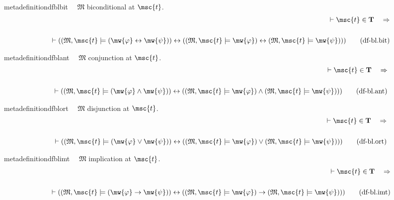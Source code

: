 \begin{restatable}{metadefinition}{dfblbit}~~ $\mathfrak{M}$ biconditional at
$\msc{t}$.
\begin{align}
\vdash \msc{t} \in \mathbf{T}\quad\Rightarrow \notag \\ 
	 \notag \\ 
	\quad \vdash ( ( \mathfrak{M} ,
    \msc{t} \models ( \mw{\varphi} \leftrightarrow \mw{\psi} ) )
    \leftrightarrow ( ( \mathfrak{M} , \msc{t} \models \mw{\varphi} )
    \leftrightarrow ( \mathfrak{M} , \msc{t} \models \mw{\psi} ) )
    )\label{eq:df-bl.bit}\tag{df-bl.bit}
\end{align}
\end{restatable}

\begin{restatable}{metadefinition}{dfblant}~~ $\mathfrak{M}$ conjunction at
$\msc{t}$.
\begin{align}
\vdash \msc{t} \in \mathbf{T}\quad\Rightarrow \notag \\ 
	 \notag \\ 
	\quad \vdash ( ( \mathfrak{M} ,
    \msc{t} \models ( \mw{\varphi} \wedge \mw{\psi} ) ) \leftrightarrow ( (
    \mathfrak{M} , \msc{t} \models \mw{\varphi} ) \wedge ( \mathfrak{M} ,
    \msc{t} \models \mw{\psi} ) ) )\label{eq:df-bl.ant}\tag{df-bl.ant}
\end{align}
\end{restatable}

\begin{restatable}{metadefinition}{dfblort}~~ $\mathfrak{M}$ disjunction at
$\msc{t}$.
\begin{align}
\vdash \msc{t} \in \mathbf{T}\quad\Rightarrow \notag \\ 
	 \notag \\ 
	\quad \vdash ( ( \mathfrak{M} ,
    \msc{t} \models ( \mw{\varphi} \vee \mw{\psi} ) ) \leftrightarrow ( (
    \mathfrak{M} , \msc{t} \models \mw{\varphi} ) \vee ( \mathfrak{M} , \msc{t}
    \models \mw{\psi} ) ) )\label{eq:df-bl.ort}\tag{df-bl.ort}
\end{align}
\end{restatable}

\begin{restatable}{metadefinition}{dfblimt}~~ $\mathfrak{M}$ implication at
$\msc{t}$.
\begin{align}
\vdash \msc{t} \in \mathbf{T}\quad\Rightarrow \notag \\ 
	 \notag \\ 
	\quad \vdash ( ( \mathfrak{M} ,
    \msc{t} \models ( \mw{\varphi} \rightarrow \mw{\psi} ) ) \leftrightarrow (
    ( \mathfrak{M} , \msc{t} \models \mw{\varphi} ) \rightarrow ( \mathfrak{M}
    , \msc{t} \models \mw{\psi} ) ) )\label{eq:df-bl.imt}\tag{df-bl.imt}
\end{align}
\end{restatable}

